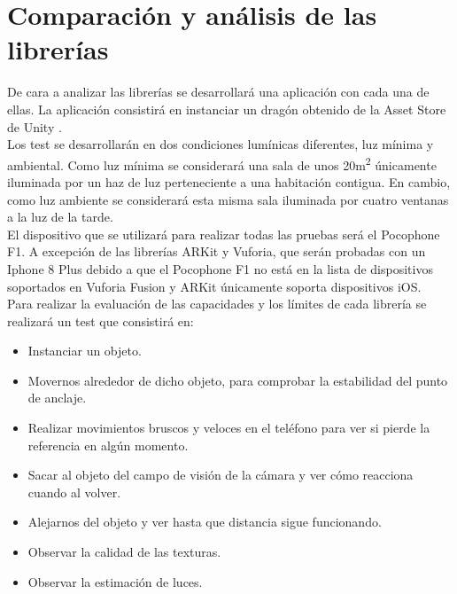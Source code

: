 
\chapter{Comparación y análisis de las librerías}\label{desarrollo}
\renewcommand{\thefootnote}{\arabic{footnote}}

De cara a analizar las librerías se desarrollará una aplicación con cada una de ellas. La aplicación consistirá en instanciar un dragón obtenido de la Asset Store de Unity \cite{AssetStore}.\\

Los test se desarrollarán en dos condiciones lumínicas diferentes, luz mínima y ambiental.
Como luz mínima se considerará una sala de unos 20m\textsuperscript{2} únicamente iluminada por un haz de luz perteneciente a una habitación contigua. En cambio, como luz ambiente se considerará esta misma sala iluminada por cuatro ventanas a la luz de la tarde.\\

El dispositivo que se utilizará para realizar todas las pruebas será el Pocophone F1. A excepción de las librerías ARKit y Vuforia, que serán probadas con un Iphone 8 Plus debido a que el Pocophone F1 no está en la lista de dispositivos soportados en Vuforia Fusion \cite{Vuforia_Devices} y ARKit únicamente soporta dispositivos iOS.\\

Para realizar la evaluación de las capacidades y los límites de cada librería se realizará un test que consistirá en:
\begin{itemize}
\item Instanciar un objeto.
\item Movernos alrededor de dicho objeto, para comprobar la estabilidad del punto de anclaje.
\item Realizar movimientos bruscos y veloces en el teléfono para ver si pierde la referencia en algún momento.
\item Sacar al objeto del campo de visión de la cámara y ver cómo reacciona cuando al volver.
\item Alejarnos del objeto y ver hasta que distancia sigue funcionando.
\item Observar la calidad de las texturas.
\item Observar la estimación de luces.

\end{itemize}

